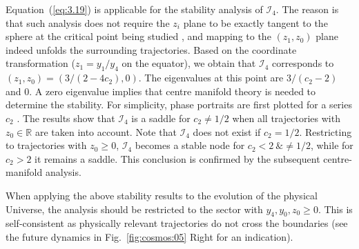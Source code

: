 \documentclass[aps,prd,twocolumn]{revtex4-2}
\begin{document}
Equation~(\ref{eq:3.19}) is applicable for the stability analysis of $\mathcal{I}_4$. The reason is that such analysis does not require the $z_i$ plane to be exactly tangent to the sphere at the critical point being studied \cite{Perko2001.book}, and mapping to the $(z_1,z_0)$ plane indeed unfolds the surrounding trajectories. Based on the coordinate transformation ($z_1=y_1/y_4$ on the equator), we obtain that $\mathcal{I}_4$ corresponds to $(z_1,z_0)=(3/(2-4c_2),0)$. The eigenvalues at this point are $3/(c_2-2)$ and $0$. A zero eigenvalue implies that centre manifold theory is needed to determine the stability. For simplicity, phase portraits are first plotted for a series $c_2$ \cite{NotShown}. The results show that $\mathcal{I}_4$ is a saddle for $c_2\neq1/2$ when all trajectories with $z_0\in\mathbb{R}$ are taken into account. Note that $\mathcal{I}_4$ does not exist if $c_2=1/2$. Restricting to trajectories with $z_0\geqslant0$, $\mathcal{I}_4$ becomes a stable node for $c_2<2\ \&\neq1/2$, while for $c_2>2$ it remains a saddle. This conclusion is confirmed by the subsequent centre-manifold analysis.

When applying the above stability results to the evolution of the physical Universe, the analysis should be restricted to the sector with $y_4,y_0,z_0\geqslant0$. This is self-consistent as physically relevant trajectories do not cross the boundaries (see the future dynamics in Fig.~\ref{fig:cosmos:05} Right for an indication).
\end{document}
